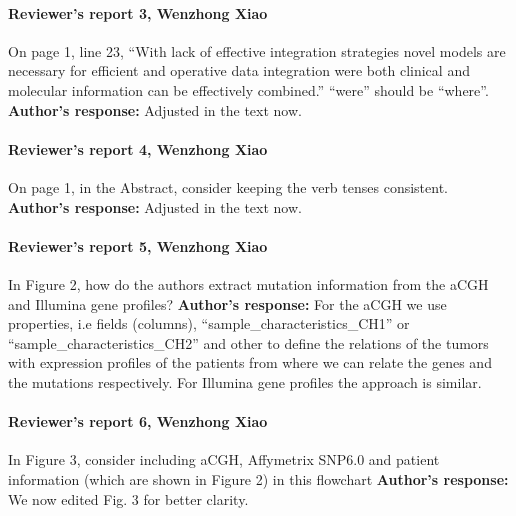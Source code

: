 \documentclass{bmcart}
\begin{document}
\paragraph {Reviewer's report 3, Wenzhong Xiao}
On page 1, line 23, “With lack of effective integration strategies novel models are necessary for efficient and operative data integration were both clinical and molecular information can be effectively combined.” “were” should be “where”.
\newline \textbf{Author's response:}
Adjusted in the text now.


\paragraph {Reviewer's report 4, Wenzhong Xiao}
On page 1, in the Abstract, consider keeping the verb tenses consistent.
\newline \textbf{Author's response:}
Adjusted in the text now.


\paragraph {Reviewer's report 5, Wenzhong Xiao}
 In Figure 2, how do the authors extract mutation information from the aCGH and Illumina gene profiles? 
\newline \textbf{Author's response:}
For the aCGH we use properties, i.e fields (columns), “sample\_characteristics\_CH1” or “sample\_characteristics\_CH2” and other to define the relations of the tumors with expression profiles of the patients from where we can relate the genes and the mutations respectively. For Illumina gene profiles the approach is similar.


\paragraph {Reviewer's report 6, Wenzhong Xiao}
In Figure 3, consider including aCGH, Affymetrix SNP6.0 and patient information (which are shown in Figure 2) in this flowchart
\newline \textbf{Author's response:}
We now edited Fig. 3 for better clarity.
\end{document}
